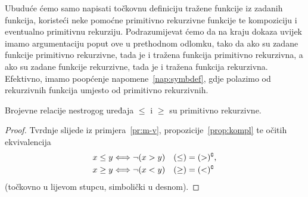 Ubuduće ćemo samo napisati točkovnu definiciju tražene funkcije iz zadanih funkcija, koristeći neke pomoćne primitivno rekurzivne funkcije te kompoziciju i eventualno primitivnu rekurziju. Podrazumijevat ćemo da na kraju dokaza uvijek imamo argumentaciju poput ove u prethodnom odlomku, tako da ako su zadane funkcije primitivno rekurzivne, tada je i tražena funkcija primitivno rekurzivna, a ako su zadane funkcije rekurzivne, tada je i tražena funkcija rekurzivna. Efektivno, imamo poopćenje napomene~\ref{nap:symbdef}, gdje polazimo od rekurzivnih funkcija umjesto od primitivno rekurzivnih.

\begin{korolar}[{name=[primitivna rekurzivnost relacija nestrogog uređaja]}]\label{kor:mj-vj}
Brojevne relacije nestrogog uređaja $\le$ i $\ge$ su primitivno rekurzivne.
\end{korolar}
\begin{proof}
Tvrdnje slijede iz primjera~\ref{pr:m-v}, propozicije~\ref{prop:kompl} te očitih ekvivalencija
\begin{align}
    x\le y&\Longleftrightarrow\lnot(x>y) & (\le) &= (>)\sp{{\scriptscriptstyle\complement}}\text,\\
    x\ge y&\Longleftrightarrow\lnot(x<y) & (\ge) &= (<)\sp{{\scriptscriptstyle\complement}}
\end{align}
(točkovno u lijevom stupcu, simbolički u desnom).
\end{proof}

